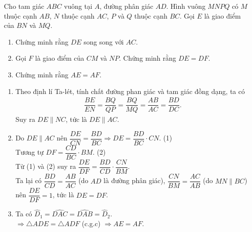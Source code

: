 \begin{bt}%
 Cho tam giác $ABC$ vuông tại $A$, đường phân giác $AD$. Hình vuông $MNPQ$ có $M$ thuộc cạnh $AB$, $N$ thuộc cạnh $AC$, $P$ và $Q$ thuộc cạnh $BC$. Gọi $E$ là giao điểm của $BN$ và $MQ$.
 \begin{enumerate}
  \item Chứng minh rằng $DE$ song song với $AC$.
  \item Gọi $F$ là giao điểm của $CM$ và $NP$. Chứng minh rằng $DE = DF$.
  \item Chứng minh rằng $AE = AF$.
 \end{enumerate}
 \loigiai
  {
  \begin{center}
  \end{center}
  \begin{enumerate}
   \item Theo định lí Ta-lét, tính chất đường phan giác và tam giác đồng dạng, ta có
   \begin{align*}
    \dfrac{BE}{EN} = \dfrac{BQ}{QP} = \dfrac{BQ}{MQ} = \dfrac{AB}{AC} = \dfrac{BD}{DC}.
   \end{align*}
   Suy ra $DE \parallel NC$, tức là $DE \parallel AC$.
   \item Do $DE \parallel AC$ nên $\dfrac{DE}{CN} = \dfrac{BD}{BC} \Rightarrow DE = \dfrac{BD}{BC} \cdot CN$. \hfill (1)\\
   Tương tự $DF = \dfrac{CD}{BC} \cdot BM$. \hfill (2)\\
   Từ (1) và (2) suy ra $\dfrac{DE}{DF} = \dfrac{BD}{CD} \cdot \dfrac{CN}{BM}$.\\
   Ta lại có $\dfrac{BD}{CD} = \dfrac{AB}{AC}$ (do $AD$ là đường phân giác), $\dfrac{CN}{BM} = \dfrac{AC}{AB}$ (do $MN \parallel BC$) nên $\dfrac{DE}{DF} = 1$, tức là $DE = DF$.
   \item Ta có $\widehat{D}_1 = \widehat{DAC} = \widehat{DAB} = \widehat{D}_2$.\\
   $\Rightarrow \triangle ADE = \triangle ADF$ (c.g.c) $\Rightarrow AE = AF$.
  \end{enumerate}
  }
\end{bt}



